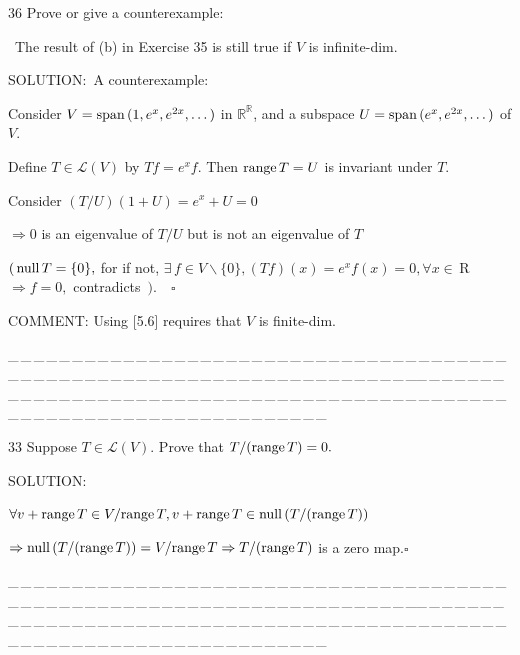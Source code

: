 \documentclass[a4paper, 11pt, UTF8]{article}
\def\range{\textup{range}\,}
\def\null{\textup{null\,}}
\def\Spn{\textup{span}\,}
\def\Lm{\mathcal{L}}
\def\Rbf{$\,{\timesbf R}\,$}
\def\Rbb{\mathbb{R}}
\begin{document}
\begin{large}
{\timesbf\Large 36} {\timessl\Large 
Prove or give a counterexample:}\par\quad\,
{\timessl\Large The result of } {\Large(b)} {\timessl\Large in Exercise 35 is still true if $V$ is infinite-dim.
}\par
{\timesbf S\footnotesize{OLUTION:}}\,\,\,A counterexample:\par\quad
Consider $V=\Spn(1,e^x,e^{2x},\dots)$ in $\Rbb^\Rbb$, and a subspace $U=\Spn(e^x,e^{2x},\dots)$ of $V$.\par\quad
Define $T\in\Lm(V)$ by $Tf=e^x f.$ Then $\range T=U$ is invariant under $T.$\par\quad
Consider $(T/U)(1+U)=e^x+U=0$\par\quad
$\Rightarrow 0$ is an eigenvalue of $T/U$ but is not an eigenvalue of $T$\par\quad
$(\,\null T=\{0\},$ for if not, $\exists\,f\in V\backslash\{0\},(Tf)(x)=e^{x}f(x)=0,\forall x\in\Rbf\Rightarrow f=0,$ contradicts $\,).\quad\square$\par
C{\small OMMENT:} Using [5.6] requires that $V$ is finite-dim.\par
{\tiny \_\,\_\,\_\,\_\,\_\,\_\,\_\,\_\,\_\,\_\,\_\,\_\,\_\,\_\,\_\,\_\,\_\,\_\,\_\,\_\,\_\,\_\,\_\,\_\,\_\,\_\,\_\,\_\,\_\,\_\,\_\,\_\,\_\,\_\,\_\,\_\,\_\,\_\,\_\,\_\,\_\,\_\,\_\,\_\,\_\,\_\,\_\,\_\,\_\,\_\,\_\,\_\,\_\,\_\,\_\,\_\,\_\,\_\,\_\,\_\,\_\,\_\,\_\,\_\,\_\,\_\,\_\,\_\,\_\,\_\,\_\_\,\_\,\_\,\_\,\_\,\_\,\_\,\_\,\_\,\_\,\_\,\_\,\_\,\_\,\_\,\_\,\_\,\_\,\_\,\_\,\_\,\_\,\_\,\_\,\_\,\_\,\_\,\_\,\_\,\_\,\_\,\_\,\_\,\_\,\_\,\_\,\_\,\_\,\_\,\_\,\_\,\_\,\_\,\_\,\_\,\_\,\_\,\_\,\_\,\_\,\_\,\_\,\_\,\_\,\_\,\_\,\_\,\_\,\_\,\_\,\_\,\_\,\_\,\_\,\_\,\_\,\_\,\_\,\_\,\_\,\_}\par


{\timesbf\Large 33} {\timessl\Large 
Suppose $T\in\Lm(V).$ Prove that $T/(\range T)=0.$
}\par
{\timesbf S\footnotesize{OLUTION:}}\par\quad
$\forall v+\range T\in V/\range T,v+\range T\in\null(T/(\range T))$\par\quad
$\Rightarrow\null(T/(\range T))=V/\range T\Rightarrow T/(\range T)$ is a zero map.\quad$\square$\par
{\tiny \_\,\_\,\_\,\_\,\_\,\_\,\_\,\_\,\_\,\_\,\_\,\_\,\_\,\_\,\_\,\_\,\_\,\_\,\_\,\_\,\_\,\_\,\_\,\_\,\_\,\_\,\_\,\_\,\_\,\_\,\_\,\_\,\_\,\_\,\_\,\_\,\_\,\_\,\_\,\_\,\_\,\_\,\_\,\_\,\_\,\_\,\_\,\_\,\_\,\_\,\_\,\_\,\_\,\_\,\_\,\_\,\_\,\_\,\_\,\_\,\_\,\_\,\_\,\_\,\_\,\_\,\_\,\_\,\_\,\_\,\_\_\,\_\,\_\,\_\,\_\,\_\,\_\,\_\,\_\,\_\,\_\,\_\,\_\,\_\,\_\,\_\,\_\,\_\,\_\,\_\,\_\,\_\,\_\,\_\,\_\,\_\,\_\,\_\,\_\,\_\,\_\,\_\,\_\,\_\,\_\,\_\,\_\,\_\,\_\,\_\,\_\,\_\,\_\,\_\,\_\,\_\,\_\,\_\,\_\,\_\,\_\,\_\,\_\,\_\,\_\,\_\,\_\,\_\,\_\,\_\,\_\,\_\,\_\,\_\,\_\,\_\,\_\,\_\,\_\,\_\,\_}\par


\end{large}
\end{document}
